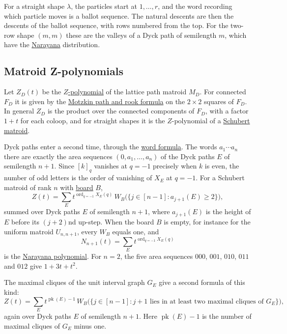 For a straight shape $\lambda$, the particles start at $1,\dotsc,r$, and the
word recording which particle moves is a ballot sequence.  The natural descents
are then the descents of the ballot sequence, with rows numbered from the top.
For the two-row shape $(m,m)$ these are the valleys of a Dyck path of
semilength $m$, which have the \hyperref[narayanaNumbers]{Narayana}
distribution.


\subsection[dyckPathZPolynomials]{Matroid Z-polynomials}

Let $Z_D(t)$ be the \hyperref[matroidZPolynomial]{$Z$-polynomial} of the
lattice path matroid $M_D$.  For connected $F_D$ it is given by the
\hyperref[schubertMatroidZRookMotzkin]{Motzkin path and rook formula} on the
$2\times2$ squares of $F_D$.  In general $Z_D$ is the product over the
connected components of $F_D$, with a factor $1+t$ for each coloop, and for straight shapes it is the $Z$-polynomial
of a \hyperref[schubertMatroidZ]{Schubert matroid}.

Dyck paths enter a second time, through the
\hyperref[schubertMatroidZWordFormula]{word formula}.  The words
$a_1\dotsm a_n$ there are exactly the area sequences $(0,a_1,\dotsc,a_n)$ of the
Dyck paths $E$ of semilength $n+1$.  Since $[k]_q$ vanishes at $q=-1$ precisely
when $k$ is even, the number of odd letters is the order of vanishing of $X_E$
at $q=-1$.  For a Schubert matroid of rank $n$ with
\hyperref[schubertMatroidZBoard]{board} $B$,
\[
  Z(t)=\sum_{E}t^{\operatorname{ord}_{q=-1}X_E(q)}\,
  W_B\bigl(\{j\in[n-1]: a_{j+1}(E)\geq2\}\bigr),
\]
summed over Dyck paths $E$ of semilength $n+1$, where $a_{j+1}(E)$ is the
height of $E$ before its $(j+2)$nd up-step.  When the board $B$ is empty,
for instance for the uniform matroid $U_{n,n+1}$, every $W_B$ equals one, and
\[
  N_{n+1}(t)=\sum_{E}t^{\operatorname{ord}_{q=-1}X_E(q)}
\]
is the \hyperref[narayanaNumbers]{Narayana polynomial}.  For $n=2$, the five
area sequences $000$, $001$, $010$, $011$ and $012$ give $1+3t+t^2$.

The maximal cliques of the unit interval graph $G_E$ give a second formula of
this kind:
\[
  Z(t)=\sum_{E}t^{\operatorname{pk}(E)-1}\,
  W_B\bigl(\{j\in[n-1]: j+1\text{ lies in at least two maximal cliques of }G_E\}\bigr),
\]
again over Dyck paths $E$ of semilength $n+1$.  Here $\operatorname{pk}(E)-1$
is the number of maximal cliques of $G_E$ minus one.

